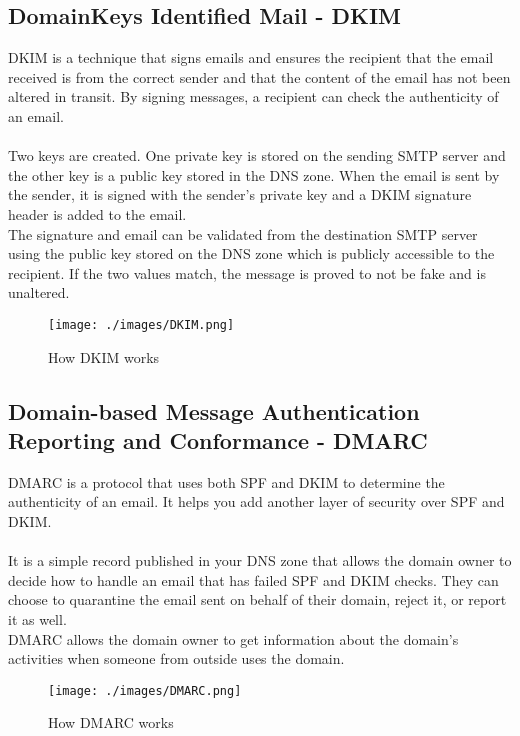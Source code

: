 \subsection{DomainKeys Identified Mail - DKIM}
DKIM is a technique that signs emails and ensures the recipient that the email received is from the correct sender and that the content of the email has not been altered in transit.
By signing messages, a recipient can check the authenticity of an email. \\
\\Two keys are created. One private key is stored on the sending SMTP server and the other key is a public key stored in the DNS zone. 
When the email is sent by the sender, it is signed with the sender's private key and a DKIM signature header is added to the email.  \\ 
The signature and email can be validated from the destination SMTP server using the public key stored on the DNS zone which is publicly accessible to the recipient.
If the two values match, the message is proved to not be fake and is unaltered.

\begin{figure}[H]
    \centering
    \texttt{[image: ./images/DKIM.png]}
    \caption{How DKIM works}
\end{figure}

\subsection{Domain-based Message Authentication Reporting and Conformance - DMARC}
DMARC is a protocol that uses both SPF and DKIM to determine the authenticity of an email. It helps you add another layer of security over SPF and DKIM. \\
\\ It is a simple record published in your DNS zone that allows the domain owner to decide how to handle an email that has failed SPF and DKIM checks. 
They can choose to quarantine the email sent on behalf of their domain, reject it, or report it as well. \\
DMARC allows the domain owner to get information about the domain's activities when someone from outside uses the domain.

\begin{figure}[H]
    \centering
    \texttt{[image: ./images/DMARC.png]}
    \caption{How DMARC works}
\end{figure}


